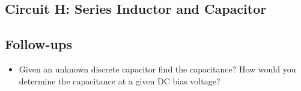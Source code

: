 \documentclass[main.tex]{subfiles}
\begin{document}



\subsection{Circuit H: Series Inductor and Capacitor}

\subsection{Follow-ups}
\begin{itemize}
    \item Given an unknown discrete capacitor find the capacitance? How would you determine the capacitance at a given DC bias voltage?
\end{itemize}
\end{document}
